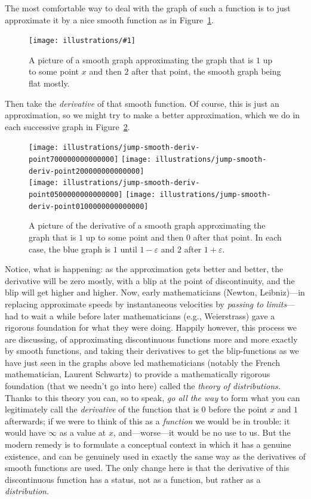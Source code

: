 \documentclass[11pt]{article}
\newcommand{\ill}[3]{ 
   \begin{figure}[htbp]
   \begin{center}
   \texttt{[image: illustrations/\#1]}
   \caption{#3}
   \end{center}
    \end{figure}
}
\theoremstyle{plain}
\theoremstyle{definition}
\numberwithin{equation}{section}
\numberwithin{figure}{section}
\numberwithin{table}{section}
\begin{document}
The most comfortable way to deal with the graph of such a function is
to just approximate it by a nice smooth function as in
Figure~\ref{fig:jumpsmooth}.
    
   
\ill{jump-smooth}{0.5}{A picture of a smooth graph approximating the
  graph that is $1$ up to some point $x$ and then $2$ after that
  point, the smooth graph being flat mostly.\label{fig:jumpsmooth}}

Then take the {\em derivative} of that smooth function.  Of course,
this is just an approximation, so we might try to make a better
approximation, which we do in each successive graph in
Figure~\ref{fig:derivsmoothapprox}.

\begin{figure}[htbp]
\begin{center}
\texttt{[image: illustrations/jump-smooth-deriv-point700000000000000]}
\texttt{[image: illustrations/jump-smooth-deriv-point200000000000000]}\\
\texttt{[image: illustrations/jump-smooth-deriv-point0500000000000000]}
\texttt{[image: illustrations/jump-smooth-deriv-point0100000000000000]}\\

\caption{A picture of the derivative of a smooth
  graph approximating the graph that is $1$ up to some point and then
  $0$ after that point.  In each case, the blue graph is $1$ until
  $1-\varepsilon$ and $2$ after $1+\varepsilon$.\label{fig:derivsmoothapprox}}
\end{center}
\end{figure}

Notice, what is happening: as the approximation gets better and
better, the derivative will be zero mostly, with a blip at the point
of discontinuity, and the blip will get higher and higher.  Now, early
mathematicians (Newton, Leibniz)---in replacing approximate speeds by
instantaneous velocities by {\em passing to limits}---had to wait a
while before later mathematicians (e.g., Weierstrass) gave a rigorous
foundation for what they were doing.  Happily however, this process we
are discussing, of approximating discontinuous functions more and more
exactly by smooth functions, and taking their derivatives to get the
blip-functions as we have just seen in the graphs above led
mathematicians (notably the French mathematician, Laurent Schwartz) to
provide a mathematically rigorous foundation (that we needn't go into
here) called the {\em theory of distributions.} Thanks to this theory
you can, so to speak, {\em go all the way} to form what you can
legitimately call the {\em derivative} of the function that is $0$
before the point $x$ and $1$ afterwards; if we were to think of this
as a {\em function} we would be in trouble: it would have $\infty$ as
a value at $x$, and---worse---it would be no use to us. But the modern
remedy is to formulate a conceptual context in which it has a genuine
existence, and can be genuinely used in exactly the same way as the
derivatives of smooth functions are used. The only change here is that
the derivative of this discontinuous function has a status, not as a
function, but rather as a {\em distribution}.  
\end{document}
